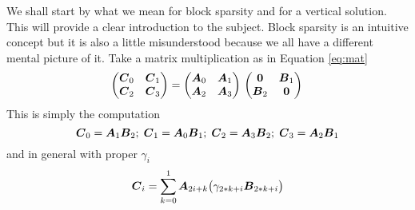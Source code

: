 \documentclass[conference]{IEEEtran}
\begin{document}
We shall start by what we mean for block sparsity and for a vertical
solution. This will provide a clear introduction to the subject. Block
sparsity is an intuitive concept but it is also a little misunderstood
because we all have a different mental picture of it. Take a matrix
multiplication as in Equation \ref{eq:mat}
\begin{equation}
  \label{eq:mat}
  \begin{pmatrix}
    \Vc{C}_0 & \Vc{C}_1 \\
    \Vc{C}_2 & \Vc{C}_3 \\ 
  \end{pmatrix} = 
  \begin{pmatrix}
    \Vc{A}_0 & \Vc{A}_1 \\
    \Vc{A}_2 & \Vc{A}_3 \\ 
  \end{pmatrix}\\
  \begin{pmatrix}
    \Vc{0}   & \Vc{B}_1 \\
    \Vc{B}_2 & \Vc{0} \\ 
  \end{pmatrix}\\
\end{equation}
This is simply the computation
{\small \begin{equation}
  {\boldsymbol C}_0 = {\boldsymbol A}_{1} {\boldsymbol B}_{2}; \;
  {\boldsymbol C}_1 = {\boldsymbol A}_{0} {\boldsymbol B}_{1}; \;
  {\boldsymbol C}_2 = {\boldsymbol A}_{3} {\boldsymbol B}_{2}; \;
  {\boldsymbol C}_3 = {\boldsymbol A}_{2} {\boldsymbol B}_{1}
\end{equation}}
and in general with proper $\gamma_i$
\begin{equation}
  {\boldsymbol C}_i = \sum_{k=0}^1 {\boldsymbol A}_{2i+ k} \big(\gamma_{2*k+i} {\boldsymbol B}_{2*k+i}\big)
\end{equation}
\end{document}

